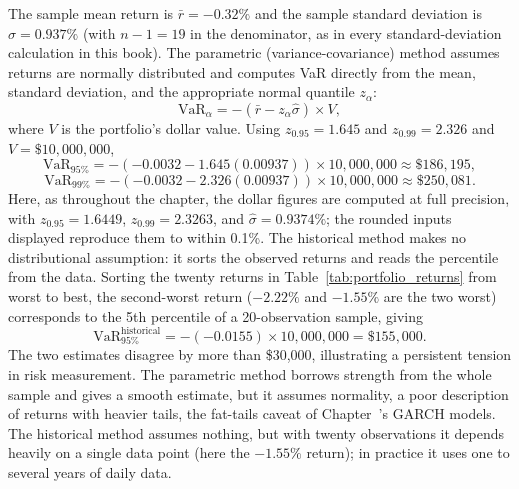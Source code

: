 \documentclass[../ai_in_finance]{subfiles}
\begin{document}
The sample mean return is $\bar r = -0.32\%$ and the sample standard deviation is $\hat\sigma = 0.937\%$ (with $n-1=19$ in the denominator, as in every standard-deviation calculation in this book). The parametric (variance-covariance) method assumes returns are normally distributed and computes VaR directly from the mean, standard deviation, and the appropriate normal quantile $z_\alpha$:
\begin{equation}
\label{eq:marketrisk-parametric-var}
\text{VaR}_\alpha = -(\bar r - z_\alpha \hat\sigma) \times V,
\end{equation}
where $V$ is the portfolio's dollar value. Using $z_{0.95}=1.645$ and $z_{0.99}=2.326$ and $V=\$10{,}000{,}000$,
\begin{equation*}
\text{VaR}_{95\%} = -(-0.0032 - 1.645(0.00937)) \times 10{,}000{,}000 \approx \$186{,}195,
\end{equation*}
\begin{equation*}
\text{VaR}_{99\%} = -(-0.0032 - 2.326(0.00937)) \times 10{,}000{,}000 \approx \$250{,}081.
\end{equation*}
Here, as throughout the chapter, the dollar figures are computed at full precision, with $z_{0.95}=1.6449$, $z_{0.99}=2.3263$, and $\hat\sigma=0.9374\%$; the rounded inputs displayed reproduce them to within 0.1\%.
The historical method makes no distributional assumption: it sorts the observed returns and reads the percentile from the data. Sorting the twenty returns in Table~\ref{tab:portfolio_returns} from worst to best, the second-worst return ($-2.22\%$ and $-1.55\%$ are the two worst) corresponds to the 5th percentile of a 20-observation sample, giving
\begin{equation*}
\text{VaR}_{95\%}^{\text{historical}} = -(-0.0155) \times 10{,}000{,}000 = \$155{,}000.
\end{equation*}
The two estimates disagree by more than \$30,000, illustrating a persistent tension in risk measurement. The parametric method borrows strength from the whole sample and gives a smooth estimate, but it assumes normality, a poor description of returns with heavier tails, the fat-tails caveat of Chapter~'s GARCH models. The historical method assumes nothing, but with twenty observations it depends heavily on a single data point (here the $-1.55\%$ return); in practice it uses one to several years of daily data.
\end{document}

